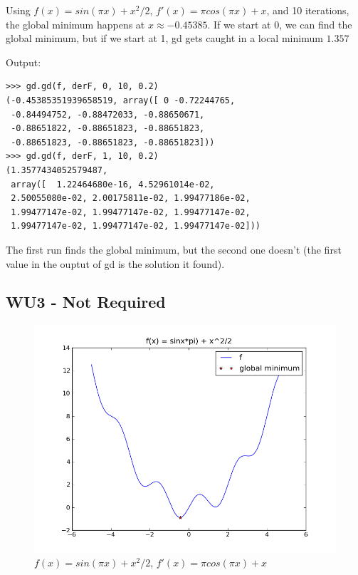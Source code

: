 \documentclass[a4paper,11pt]{article}
\begin{document}
Using $f(x) = sin(\pi x) + x^2/2$, $f'(x) = \pi cos(\pi x) + x$, and
10 iterations, the
global minimum happens at $x\approx -0.45385$.
If we start at 0, we can find the global minimum, but if we start at
1, gd gets caught in a local minimum $1.357$

Output:
\begin{verbatim}
>>> gd.gd(f, derF, 0, 10, 0.2)
(-0.45385351939658519, array([ 0 -0.72244765, 
 -0.84494752, -0.88472033, -0.88650671, 
 -0.88651822, -0.88651823, -0.88651823, 
 -0.88651823, -0.88651823, -0.88651823]))
>>> gd.gd(f, derF, 1, 10, 0.2)
(1.3577434052579487, 
 array([  1.22464680e-16, 4.52961014e-02,
 2.50055080e-02, 2.00175811e-02, 1.99477186e-02, 
 1.99477147e-02, 1.99477147e-02, 1.99477147e-02, 
 1.99477147e-02, 1.99477147e-02, 1.99477147e-02]))
\end{verbatim}

The first run finds the global minimum, but the second one
doesn't (the first value in the ouptut of gd is the solution it found).

\subsection{WU3 - Not Required}

\newpage

\begin{figure}[!ht]
  \begin{center}
  \includegraphics[width=4.5in]{wu2.png}
  \caption{$f(x) = sin(\pi x) + x^2/2$, $f'(x) = \pi cos(\pi x) + x$}
  \end{center}
\end{figure}
\end{document}
